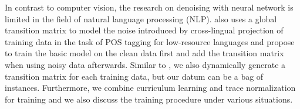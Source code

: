 \documentclass[11pt,a4paper]{article}
\begin{document}
In contrast to computer vision, the research on denoising with neural network is limited in the field of natural language processing (NLP). \cite{fang2016learning} also uses a global transition matrix to model the noise introduced by cross-lingual projection of training data in the task of POS tagging for low-resource languages and propose to train the basic model on the clean data first and add the transition matrix when using noisy data afterwards. Similar to \cite{misra2016seeing}, we also dynamically generate a transition matrix for each training data, but our datum can be a bag of instances. Furthermore, we combine curriculum learning and trace normalization for training and we also discuss the training procedure under various situations. 

\end{document}
